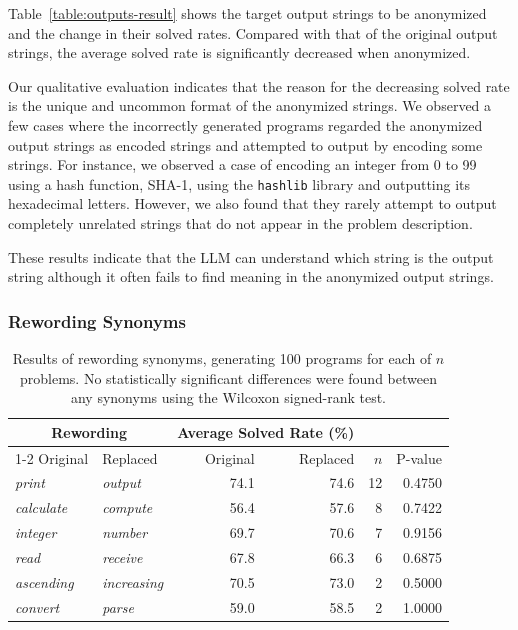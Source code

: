 \documentclass{article}
\begin{document}
Table~\ref{table:outputs-result} shows the target output strings to be anonymized and the change in their solved rates.
Compared with that of the original output strings, the average solved rate is significantly decreased when anonymized.

Our qualitative evaluation indicates that the reason for the decreasing solved rate is the unique and uncommon format of the anonymized strings.
We observed a few cases where the incorrectly generated programs regarded the anonymized output strings as encoded strings and attempted to output by encoding some strings.
For instance, we observed a case of encoding an integer from 0 to 99 using a hash function, SHA-1, using the \texttt{hashlib} library and outputting its hexadecimal letters.
However, we also found that they rarely attempt to output completely unrelated strings that do not appear in the problem description.

These results indicate that the LLM can understand which string is the output string although it often fails to find meaning in the anonymized output strings.







\subsubsection{Rewording Synonyms}
\label{sec:results:modification:synonyms}

\begin{table}[ht]
\begin{center}
\begin{minipage}{0.73\linewidth}
    \caption{Results of rewording synonyms, generating 100 programs for each of $n$ problems. No statistically significant differences were found between any synonyms using the Wilcoxon signed-rank test.}
    \label{table:rewording-synonyms}
    \begin{tabular*}{\linewidth}
    {llrrrr}
        \toprule
        \multicolumn{2}{c}{Rewording} & \multicolumn{2}{c}{Average Solved Rate (\%)} \\
        \cmidrule{1-2}\cmidrule{3-4}
        Original & Replaced & Original & Replaced & $n$ & P-value \\
        \midrule
        \textit{print} & \textit{output} & 74.1 & 74.6 & 12 & 0.4750 \\
        \textit{calculate} & \textit{compute} & 56.4 & 57.6 & 8 & 0.7422 \\
        \textit{integer} &\textit{number} & 69.7 & 70.6 & 7 & 0.9156 \\
        \textit{read} & \textit{receive} & 67.8 & 66.3 & 6 & 0.6875 \\
        \textit{ascending} & \textit{increasing} & 70.5 & 73.0 & 2 & 0.5000 \\
        \textit{convert} & \textit{parse} & 59.0 & 58.5 & 2 & 1.0000 \\
        \bottomrule
    \end{tabular*}
\end{minipage}
\end{center}
\end{table}
\end{document}
